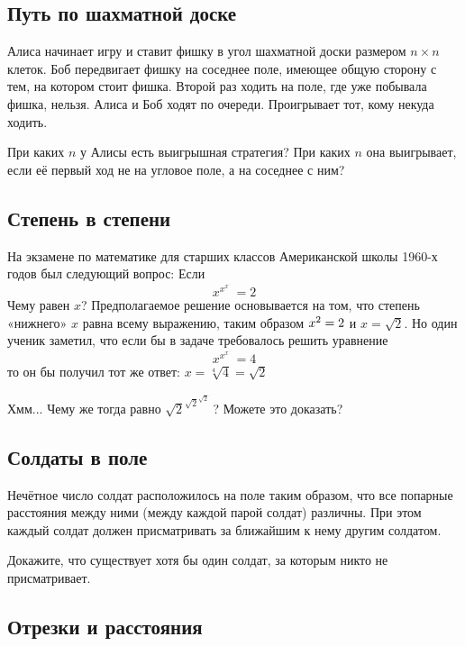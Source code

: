 \subsection*{Путь по шахматной доске} %

Алиса начинает игру и ставит фишку в угол шахматной доски размером $n{\times}n$ клеток.
Боб передвигает фишку на соседнее поле, имеющее общую сторону с тем, на котором стоит фишка.
Второй раз ходить на поле, где уже побывала фишка, нельзя. 
Алиса и Боб ходят по очереди.
Проигрывает тот, кому некуда ходить.

При каких $n$ у Алисы есть выигрышная стратегия? 
При каких $n$ она выигрывает, если её первый ход не на угловое поле, а на соседнее с ним?

\subsection*{Степень в степени} %

На экзамене по математике для старших классов Американской школы 1960-х годов 
был следующий вопрос:
Если 
$$x^{x^{x^{{\cdot}^{\cdot^{\cdot}}}}}=2$$
Чему равен $x$? 
Предполагаемое решение основывается на том, что степень «нижнего» $x$ равна всему выражению, таким образом $x^2\z=2$ и $x=\sqrt{2}$.
Но один ученик заметил, что если бы в задаче требовалось решить уравнение
$$x^{x^{x^{{\cdot}^{\cdot^{\cdot}}}}}=4$$
то он бы получил тот же ответ: $x=\sqrt[4]{4}=\sqrt{2}$

Хмм...
Чему же тогда равно ${\sqrt{2}}^{{\sqrt{2}}^{{\sqrt{2}}^{{\cdot}^{\cdot^{\cdot}}}}}$? 
Можете это доказать?

\subsection*{Солдаты в поле} %

Нечётное число солдат расположилось на поле таким образом, что все попарные расстояния между ними (между каждой парой солдат) различны.
При этом каждый солдат должен присматривать за ближайшим к нему другим солдатом.

Докажите, что существует хотя бы один солдат, за которым никто не присматривает.

\subsection*{Отрезки и расстояния} %

